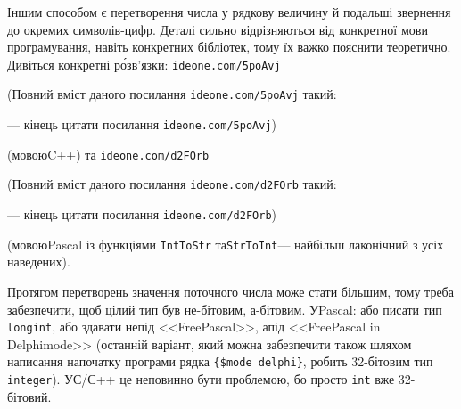 \documentclass[14pt,a4paper]{extarticle}
\renewcommand{\baselinestretch}{1.3125}
\begin{document}
Іншим способом є перетворення числа у рядкову величину й подальші звернення до окремих символів-цифр. Деталі сильно відрізняються від конкретної мови програмування, навіть конкретних бібліотек, тому їх важко пояснити теоретично. Дивіться конкретні р\'{о}зв'язки: 
\verb"ideone.com/5poAvj"


{\color{green}\begin{small}

\renewcommand{\baselinestretch}{0.875}

(Повний вміст даного посилання \verb"ideone.com/5poAvj" такий:

--- кінець цитати посилання \verb"ideone.com/5poAvj")

\end{small}}


 (мовою\nolinebreak[2] C++) та 
\verb"ideone.com/d2FOrb"


{\color{green}\begin{small}

\renewcommand{\baselinestretch}{0.875}

(Повний вміст даного посилання \verb"ideone.com/d2FOrb" такий:

--- кінець цитати посилання \verb"ideone.com/d2FOrb")

\end{small}}


 (мовою\nolinebreak[1] Pascal із функціями \texttt{IntToStr} та\nolinebreak[2] \texttt{StrToInt}\nolinebreak[3] --- найбільш лаконічний з усіх наведених).

Протягом перетворень значення поточного числа може стати більшим, тому треба забезпечити, щоб цілий тип був не-бітовим, а-бітовим. У\nolinebreak[3] Pascal: або писати тип \texttt{longint}, або здавати не\nolinebreak[3] під <<Free\nolinebreak[3] Pascal>>, а\nolinebreak[3] під <<Free\nolinebreak[3] Pascal in Delphi\nolinebreak[3] mode>> (останній варіант, який можна забезпечити також шляхом написання на\nolinebreak[3] початку програми рядка \verb"{$mode delphi}", робить 32-бітовим тип \texttt{integer}). У\nolinebreak[3] С/С++ це не\nolinebreak[3] повинно бути проблемою, бо просто \texttt{int} вже 32-бітовий. 
\end{document}

